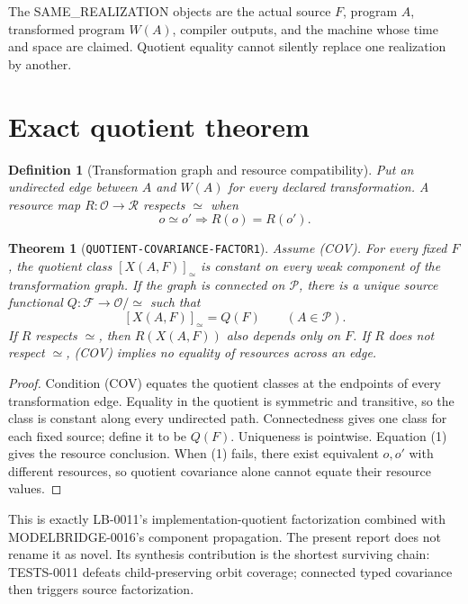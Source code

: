 \documentclass[11pt]{article}
\newtheorem{definition}{Definition}
\newtheorem{theorem}{Theorem}
\begin{document}
The SAME\_REALIZATION objects are the actual source \(F\), program
\(A\), transformed program \(W(A)\), compiler outputs, and the machine
whose time and space are claimed.  Quotient equality cannot silently replace
one realization by another.

\section{Exact quotient theorem}
\begin{definition}[Transformation graph and resource compatibility]
Put an undirected edge between \(A\) and \(W(A)\) for every declared
transformation.  A resource map \(R:\mathcal O\to\mathcal R\) respects
\(\simeq\) when
\[
 o\simeq o'\Longrightarrow R(o)=R(o').
 \tag{1}
\]
\end{definition}

\begin{theorem}[\texttt{QUOTIENT-COVARIANCE-FACTOR1}]
Assume (COV).  For every fixed \(F\), the quotient class
\([X(A,F)]_{\simeq}\) is constant on every weak component of the
transformation graph.  If the graph is connected on \(\mathcal P\), there
is a unique source functional \(Q:\mathcal F\to\mathcal O/{\simeq}\)
such that
\[
 [X(A,F)]_{\simeq}=Q(F)
 \qquad(A\in\mathcal P).
 \tag{2}
\]
If \(R\) respects \(\simeq\), then \(R(X(A,F))\) also depends only on
\(F\).  If \(R\) does not respect \(\simeq\), (COV) implies no equality
of resources across an edge.
\end{theorem}

\begin{proof}
Condition (COV) equates the quotient classes at the endpoints of every
transformation edge.  Equality in the quotient is symmetric and transitive,
so the class is constant along every undirected path.  Connectedness gives
one class for each fixed source; define it to be \(Q(F)\).  Uniqueness is
pointwise.  Equation (1) gives the resource conclusion.  When (1) fails,
there exist equivalent \(o,o'\) with different resources, so quotient
covariance alone cannot equate their resource values.
\end{proof}

This is exactly LB-0011's implementation-quotient factorization combined
with MODELBRIDGE-0016's component propagation.  The present report does not
rename it as novel.  Its synthesis contribution is the shortest surviving
chain: TESTS-0011 defeats child-preserving orbit coverage; connected typed
covariance then triggers source factorization.
\end{document}
